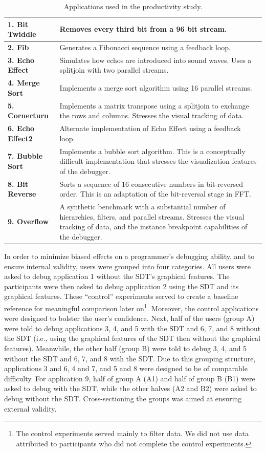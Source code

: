 \documentclass[times, 10pt,twocolumn]{article}
\begin{document}
\begin{table}
\caption{Applications used in the productivity study.}
\centering
\begin{tabular}{|l|p{5.0in}|} \hline
\label{tab:applications}
{\bf 1. Bit Twiddle} & Removes every third bit from a 96 bit stream.\\ \hline
{\bf 2. Fib}         & Generates a Fibonacci sequence using a feedback loop.\\ \hline
{\bf 3. Echo Effect} & Simulates how echos are introduced into sound waves. Uses a splitjoin with two parallel streams.\\ \hline
{\bf 4. Merge Sort}  & Implements a merge sort algorithm using 16 parallel streams.\\ \hline
{\bf 5. Cornerturn}  & Implements a matrix transpose using a splitjoin to exchange the rows and columns. Stresses the visual tracking of data.\\ \hline
{\bf 6. Echo Effect2}& Alternate implementation of Echo Effect using a feedback loop.\\ \hline
{\bf 7. Bubble Sort} & Implements a bubble sort algorithm. This is a conceptually difficult implementation that stresses the visualization features of the debugger.\\ \hline
{\bf 8. Bit Reverse} & Sorts a sequence of 16 consecutive numbers in bit-reversed order. This is an adaptation of the bit-reversal stage in FFT.\\ \hline
{\bf 9. Overflow}  & A synthetic benchmark with a substantial number of hierarchies, filters, and parallel streams. Stresses the visual tracking of data, and the instance breakpoint capabilities of the debugger.\\ \hline
\end{tabular}
\end{table}

In  order  to minimize  biased  effects  on  a programmer's  debugging
ability, and to ensure internal validity, users were grouped into four
categories.  All users  were asked to debug application  1 without the
SDT's graphical  features. The participants  were then asked  to debug
application  2  using  the  SDT  and  its  graphical  features.  These
``control''  experiments served  to  create a  baseline reference  for
meaningful comparison later on\footnote{The control experiments served
mainly to filter data. We  did not use data attributed to participants
who  did  not  complete  the control  experiments.}.   Moreover,  the
control   applications   were   designed   to   bolster   the   user's
confidence.  Next, half  of the  users (group  A) were  told  to debug
applications 3, 4, and 5 with the  SDT and 6, 7, and 8 without the SDT
(i.e.,  using the  graphical  features  of the  SDT  then without  the
graphical features). Meanwhile, the other  half (group B) were told to
debug 3, 4, and  5 without the SDT and 6, 7, and  8 with the SDT.  Due
to this grouping structure, applications 3 and 6, 4 and 7, and 5 and 8
were designed to be of comparable difficulty.  For application 9, half
of group A (A1) and half of  group B (B1) were asked to debug with the
SDT, while  the other halves (A2  and B2) were asked  to debug without
the SDT.   Cross-sectioning the groups was aimed  at ensuring external
validity.
\end{document}

